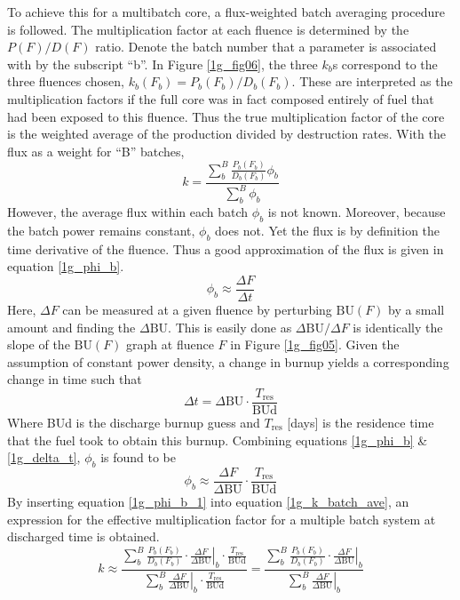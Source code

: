 To achieve this for a multibatch core, a flux-weighted batch averaging procedure is followed.  
The multiplication factor at each fluence is determined by the $P(F)/D(F)$ ratio.  Denote the batch 
number that a parameter is associated with by the subscript ``b''.  In Figure \ref{1g_fig06}, 
the three $k_b$s correspond to the three fluences chosen,  $k_b(F_b) = P_b(F_b)/D_b(F_b)$.  
These are interpreted as the multiplication factors if the full core was in fact composed entirely 
of fuel that had been exposed to this fluence. Thus the true multiplication factor of the core is 
the weighted average of the production divided by destruction rates.  With the flux as a weight for 
``B'' batches,
\begin{equation}
\label{1g_k_batch_ave}
k = \frac{\sum_b^B \frac{P_b(F_b)}{D_b(F_b)} \phi_b}{\sum_b^B \phi_b}
\end{equation}
However, the average flux within each batch $\phi_b$ is not known.  
Moreover, because the batch power remains constant, $\phi_b$ does not.  Yet the flux is by definition the time 
derivative of the fluence. Thus a good approximation of the flux is given in equation \ref{1g_phi_b}.
\begin{equation}
\label{1g_phi_b}
\phi_b \approx \frac{\Delta F}{\Delta t}
\end{equation}
Here, $\Delta F$ can be measured at a given fluence by perturbing $\mbox{BU}(F)$ by a small amount 
and finding the $\Delta\mbox{BU}$.  This is easily done as $\Delta\mbox{BU}/\Delta F$ is identically 
the slope of the $\mbox{BU}(F)$ graph at fluence $F$ in Figure \ref{1g_fig05}.  Given the 
assumption of constant power density, a change in burnup yields a corresponding change in time such that
\begin{equation}
\label{1g_delta_t}
\Delta t = \Delta\mbox{BU} \cdot \frac{T_{\mbox{res}}}{\mbox{BUd}}
\end{equation}
Where BUd is the discharge burnup guess and $T_{\mbox{res}}$ [days] is the residence time that the 
fuel took to obtain this burnup. Combining equations \ref{1g_phi_b} \& \ref{1g_delta_t}, 
$\phi_b$ is found to be
\begin{equation}
\label{1g_phi_b_1}
\phi_b \approx \frac{\Delta F}{\Delta \mbox{BU}} \cdot \frac{T_{\mbox{res}}}{\mbox{BUd}}
\end{equation}
By inserting equation \ref{1g_phi_b_1} into equation \ref{1g_k_batch_ave}, an expression for the effective 
multiplication factor for a multiple batch system at discharged time is obtained.
\begin{equation}
\label{1g_k_batch_ave_1}
k \approx \frac{\sum_b^B \frac{P_b(F_b)}{D_b(F_b)} \cdot \left. \frac{\Delta F}{\Delta \mbox{BU}} \right|_b \cdot \frac{T_{\mbox{res}}}{\mbox{BUd}}}
                {\sum_b^B \left. \frac{\Delta F}{\Delta \mbox{BU}} \right|_b \cdot \frac{T_{\mbox{res}}}{\mbox{BUd}}}
 =  \frac{\sum_b^B \frac{P_b(F_b)}{D_b(F_b)} \cdot \left. \frac{\Delta F}{\Delta \mbox{BU}} \right|_b }
                {\sum_b^B \left. \frac{\Delta F}{\Delta \mbox{BU}} \right|_b}
\end{equation}

